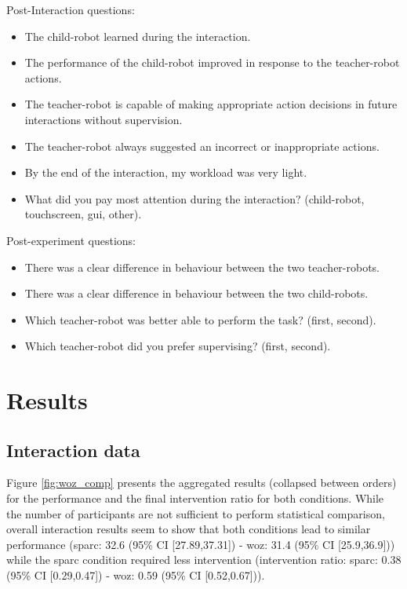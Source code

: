 Post-Interaction questions:
\begin{itemize}
	\item The child-robot learned during the interaction.
	\item The performance of the child-robot improved in response to the teacher-robot actions.
	\item The teacher-robot is capable of making appropriate action decisions in future interactions without supervision.
	\item The teacher-robot always suggested an incorrect or inappropriate actions.
	\item By the end of the interaction, my workload was very light.
	\item What did you pay most attention during the interaction? (child-robot, touchscreen, \gls{gui}, other).
\end{itemize}

Post-experiment questions:
\begin{itemize}
	\item There was a clear difference in behaviour between the two teacher-robots.
	\item There was a clear difference in behaviour between the two child-robots.
	\item Which teacher-robot was better able to perform the task? (first, second).
	\item Which teacher-robot did you prefer supervising? (first, second).
\end{itemize}

\section{Results}

\subsection{Interaction data}

Figure \ref{fig:woz_comp} presents the aggregated results (collapsed between orders) for the performance and the final intervention ratio for both conditions. While the number of participants are not sufficient to perform statistical comparison, overall interaction results seem to show that both conditions lead to similar performance (\gls{sparc}: 32.6 (95\% CI [27.89,37.31]) - \gls{woz}: 31.4 (95\% CI [25.9,36.9])) while the \gls{sparc} condition required less intervention (intervention ratio: \gls{sparc}: 0.38 (95\% CI [0.29,0.47]) - \gls{woz}: 0.59 (95\% CI [0.52,0.67])). 

